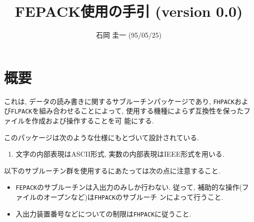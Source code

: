 %
%

\title{FEPACK使用の手引 (version 0.0)}
\author{石岡 圭一  (95/05/25)}
\date{}



\maketitle

\section{概要}

これは, データの読み書きに関するサブルーチンパッケージであり, 
{\tt FHPACK}および{\tt FLPACK}を組み合わせることによって, 
使用する機種によらず互換性を保ったファイルを作成および操作することを可
能にする.

\vspace{1em}
このパッケージは次のような仕様にもとづいて設計されている. 
\begin{enumerate}
  \item 文字の内部表現はASCII形式, 実数の内部表現はIEEE形式を用いる.
\end{enumerate}

\vspace{1em}
以下のサブルーチン群を使用するにあたっては次の点に注意すること. 
\begin{itemize}
  \item {\tt FEPACK}のサブルーチンは入出力のみしか行わない. 従って, 
        補助的な操作(ファイルのオープンなど)は{\tt FHPACK}のサブルーチ
        ンによって行うこと.
  \item 入出力装置番号などについての制限は{\tt FHPACK}に従うこと.
\end{itemize}


